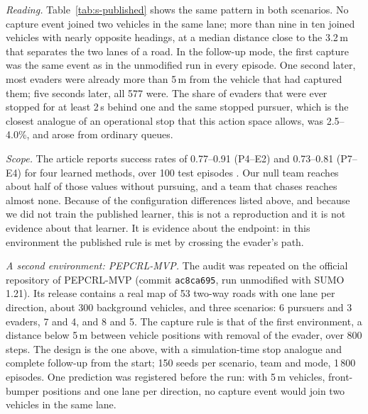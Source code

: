 \documentclass[preprint,12pt]{elsarticle}
\begin{document}
\emph{Reading.} Table~\ref{tab:s-published} shows the same pattern in both scenarios. No capture event joined two
vehicles in the same lane; more than nine in ten joined vehicles with nearly opposite headings, at a median distance
close to the 3.2\,m that separates the two lanes of a road. In the follow-up mode, the first capture was the same
event as in the unmodified run in every episode. One second later, most evaders were already more than 5\,m from the
vehicle that had captured them; five seconds later, all 577 were. The share of evaders that were ever stopped for at
least 2\,s behind one and the same stopped pursuer, which is the closest analogue of an operational stop that this
action space allows, was 2.5--4.0\%, and arose from ordinary queues.

\emph{Scope.} The article reports success rates of 0.77--0.91 (P4--E2) and 0.73--0.81 (P7--E4) for four learned
methods, over 100 test episodes \cite{li2023dgmarl}. Our null team reaches about half of those values without
pursuing, and a team that chases reaches almost none. Because of the configuration differences listed above, and
because we did not train the published learner, this is not a reproduction and it is not evidence about that learner.
It is evidence about the endpoint: in this environment the published rule is met by crossing the evader's path.

\emph{A second environment: PEPCRL-MVP.} The audit was repeated on the official repository of PEPCRL-MVP
\cite{li2024pepcrl} (commit \texttt{ac8ca695}, run unmodified with SUMO 1.21). Its release contains a real map of 53
two-way roads with one lane per direction, about 300 background vehicles, and three scenarios: 6 pursuers and 3
evaders, 7 and 4, and 8 and 5. The capture rule is that of the first environment, a distance below 5\,m between
vehicle positions with removal of the evader, over 800 steps. The design is the one above, with a simulation-time
stop analogue and complete follow-up from the start; 150 seeds per scenario, team and mode, 1\,800 episodes. One
prediction was registered before the run: with 5\,m vehicles, front-bumper positions and one lane per direction, no
capture event would join two vehicles in the same lane.
\end{document}

